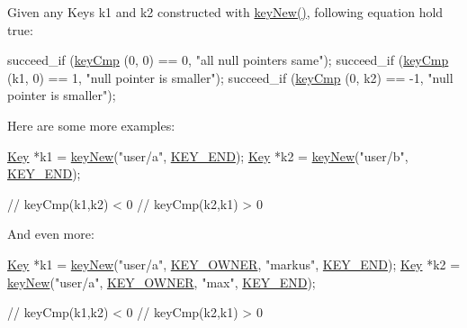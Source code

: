 Given any Keys k1 and k2 constructed with \hyperlink{group__key_gad23c65b44bf48d773759e1f9a4d43b89}{key\+New()}, following equation hold true\+:


\begin{DoxyCodeInclude}
        succeed\_if (\hyperlink{group__keytest_gaf6e66e12fe04d535a5d1c8218ced803e}{keyCmp} (0, 0) == 0, \textcolor{stringliteral}{"all null pointers same"});
        succeed\_if (\hyperlink{group__keytest_gaf6e66e12fe04d535a5d1c8218ced803e}{keyCmp} (k1, 0) == 1, \textcolor{stringliteral}{"null pointer is smaller"});
        succeed\_if (\hyperlink{group__keytest_gaf6e66e12fe04d535a5d1c8218ced803e}{keyCmp} (0, k2) == -1, \textcolor{stringliteral}{"null pointer is smaller"});
\end{DoxyCodeInclude}
 Here are some more examples\+: 
\begin{DoxyCode}
\hyperlink{classkdb_1_1Key_a5679f5cae63caddd64a60388b9cc77fa}{Key} *k1 = \hyperlink{group__key_gad23c65b44bf48d773759e1f9a4d43b89}{keyNew}(\textcolor{stringliteral}{"user/a"}, \hyperlink{group__key_gga91fb3178848bd682000958089abbaf40aa8adb6fcb92dec58fb19410eacfdd403}{KEY\_END});
\hyperlink{classkdb_1_1Key_a5679f5cae63caddd64a60388b9cc77fa}{Key} *k2 = \hyperlink{group__key_gad23c65b44bf48d773759e1f9a4d43b89}{keyNew}(\textcolor{stringliteral}{"user/b"}, \hyperlink{group__key_gga91fb3178848bd682000958089abbaf40aa8adb6fcb92dec58fb19410eacfdd403}{KEY\_END});

\textcolor{comment}{// keyCmp(k1,k2) < 0}
\textcolor{comment}{// keyCmp(k2,k1) > 0}
\end{DoxyCode}


And even more\+: 
\begin{DoxyCode}
\hyperlink{classkdb_1_1Key_a5679f5cae63caddd64a60388b9cc77fa}{Key} *k1 = \hyperlink{group__key_gad23c65b44bf48d773759e1f9a4d43b89}{keyNew}(\textcolor{stringliteral}{"user/a"}, \hyperlink{group__key_gga91fb3178848bd682000958089abbaf40a77ca60362fa8daca8d5347db4385068b}{KEY\_OWNER}, \textcolor{stringliteral}{"markus"}, \hyperlink{group__key_gga91fb3178848bd682000958089abbaf40aa8adb6fcb92dec58fb19410eacfdd403}{KEY\_END});
\hyperlink{classkdb_1_1Key_a5679f5cae63caddd64a60388b9cc77fa}{Key} *k2 = \hyperlink{group__key_gad23c65b44bf48d773759e1f9a4d43b89}{keyNew}(\textcolor{stringliteral}{"user/a"}, \hyperlink{group__key_gga91fb3178848bd682000958089abbaf40a77ca60362fa8daca8d5347db4385068b}{KEY\_OWNER}, \textcolor{stringliteral}{"max"}, \hyperlink{group__key_gga91fb3178848bd682000958089abbaf40aa8adb6fcb92dec58fb19410eacfdd403}{KEY\_END});

\textcolor{comment}{// keyCmp(k1,k2) < 0}
\textcolor{comment}{// keyCmp(k2,k1) > 0}
\end{DoxyCode}


